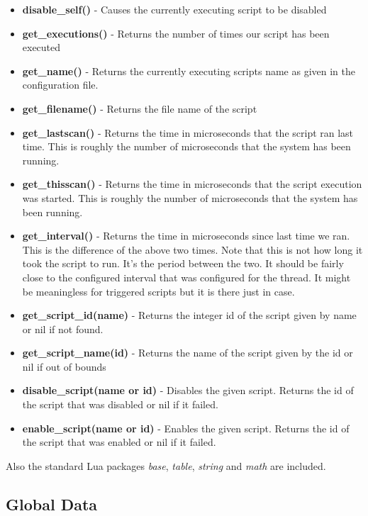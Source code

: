 \begin{itemize}
	\item \textbf{disable\_self()} - Causes the currently executing script to be disabled
	\item \textbf{get\_executions()} - Returns the number of times our script has been executed
	\item \textbf{get\_name()} - Returns the currently executing scripts name as given in
	the configuration file.
	\item \textbf{get\_filename()} - Returns the file name of the script
	\item \textbf{get\_lastscan()} - Returns the time in microseconds that the script ran last time.
	This is roughly the number of microseconds that the system has been running.
	\item \textbf{get\_thisscan()} - Returns the time in microseconds that the script execution
	was started. This is roughly the number of microseconds that the system has been running.
	\item \textbf{get\_interval()} - Returns the time in microseconds since last time we ran.
	This is the difference of the above two times. Note that this is not how long it took the script
	to run.  It's the period between the two.  It should be fairly close to the configured interval
	that was configured for the thread.  It might be meaningless for triggered scripts but it is
	there just in case.
	\item \textbf{get\_script\_id(name)} - Returns the integer id of the
	script given by
	name or nil if not found.
	\item \textbf{get\_script\_name(id)} - Returns the name of the script
	given by
	the id or nil if out of bounds
	\item \textbf{disable\_script(name or id)} - Disables the given script.
	Returns
	the id of the script that was disabled or nil if it failed.
	\item \textbf{enable\_script(name or id)} - Enables the given script.
	Returns
	the id of the script that was enabled or nil if it failed.
\end{itemize}

Also the standard Lua packages \textit{base}, \textit{table}, \textit{string}
and \textit{math} are included.

\subsection{Global Data}

